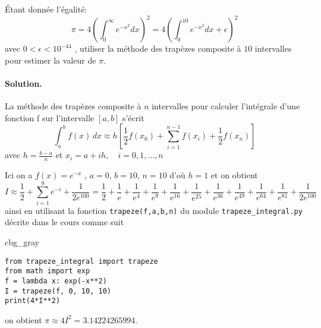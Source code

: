 \documentclass[%
oneside,                 %
final,                   %
10pt,french]{article}
\newenvironment{_cod_tight}[1]{
   \def\FrameCommand{\colorbox{#1}}
   \FrameRule0.6pt\MakeFramed {\FrameRestore}\vskip3mm}
   {\vskip0mm\endMakeFramed}
\newenvironment{cod}[1]{
\bgroup\rmfamily
\fboxsep=0mm\relax
\begin{_cod_tight}{#1}
\list{}{\parsep=-2mm\parskip=0mm\topsep=0pt\leftmargin=2mm
\rightmargin=2\leftmargin\leftmargin=4pt\relax}
\item\relax}
{\endlist\end{_cod_tight}\egroup}
\newenvironment{doconceexercise}{}{}
\newcounter{doconceexercisecounter}
\begin{document}
\begin{doconceexercise}



Étant donnée l'égalité:
\begin{equation}
\pi = 4 \left( \int_0^\infty e^{-x^2} dx \right)^2 = 4 \left( \int_0^{10} e^{-x^2} dx + \epsilon \right)^2
\end{equation}
avec $0 < \epsilon < 10^{−44}$ , utiliser la méthode des trapèzes composite à $10$ intervalles pour estimer la valeur de $\pi$.


\paragraph{Solution.}
La méthode des trapèzes composite à $n$ intervalles pour calculer l’intégrale d’une fonction f sur l’intervalle $[a, b]$ s’écrit
\begin{equation*}
\int_a^b f(x)\,dx \approx h \left[\frac{1}{2}f(x_0) + \sum_{i=1}^{n-1}f(x_i) + \frac{1}{2}f(x_n) \right]
\end{equation*}
avec $h = \frac{b-a}{n}$ et $x_i = a + ih,\quad i = 0,1,\ldots,n$

Ici on a $f (x) = e^{-x}$ , $a = 0$, $b = 10$, $n = 10$ d’où $h = 1$ et on obtient
\begin{equation*}
I \approx \frac{1}{2} + \sum_{i=1}^{9} e^{-i} + \frac{1}{2e^{100}} = \frac{1}{2} + \frac{1}{e} + \frac{1}{e^{4}} + \frac{1}{e^{9}} + \frac{1}{e^{16}} + \frac{1}{e^{25}} + \frac{1}{e^{36}} + \frac{1}{e^{49}} + \frac{1}{e^{64}} + \frac{1}{e^{81}} + \frac{1}{2e^{100}}
\end{equation*}
ainsi en utilisant la fonction \texttt{trapeze(f,a,b,n)} du module \Verb!trapeze_integral.py! décrite dans le cours comme suit
\begin{cod}{cbg_gray}\begin{verbatim}
from trapeze_integral import trapeze
from math import exp
f = lambda x: exp(-x**2)
I = trapeze(f, 0, 10, 10)
print(4*I**2)
\end{verbatim}
\end{cod}
\noindent
on obtient $\pi \approx 4I^2 = 3.14224265994$.


\end{doconceexercise}
\end{document}
